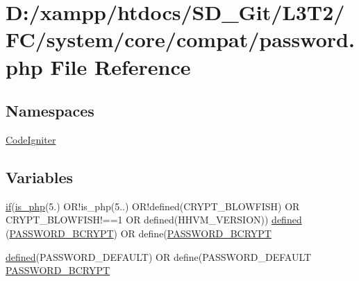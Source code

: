 \hypertarget{system_2core_2compat_2password_8php}{}\section{D\+:/xampp/htdocs/\+S\+D\+\_\+\+Git/\+L3\+T2/\+F\+C/system/core/compat/password.php File Reference}
\label{system_2core_2compat_2password_8php}
\subsection*{Namespaces}
\begin{DoxyCompactItemize}
\item 
 \hyperlink{namespace_code_igniter}{Code\+Igniter}
\end{DoxyCompactItemize}
\subsection*{Variables}
\begin{DoxyCompactItemize}
\item 
\hyperlink{_admin_2assets_2js_2bootstrap_8min_8js_a87cf461060832b8b68a7b48d9e371e4f}{if}(\hyperlink{_admin_2tests_2_bootstrap_8php_acbea7ca989439eea4c6019ad3c5161aa}{is\+\_\+php}(\textquotesingle{}5.\textquotesingle{}) O\+R!is\+\_\+php(\textquotesingle{}5..\textquotesingle{}) O\+R!defined(\textquotesingle{}C\+R\+Y\+P\+T\+\_\+\+B\+L\+O\+W\+F\+I\+S\+H\textquotesingle{}) O\+R C\+R\+Y\+P\+T\+\_\+\+B\+L\+O\+W\+F\+I\+S\+H!==1 O\+R defined(\textquotesingle{}H\+H\+V\+M\+\_\+\+V\+E\+R\+S\+I\+O\+N\textquotesingle{})) \hyperlink{system_2core_2compat_2password_8php_aabb8e1f89683202c71f81779040eb22f}{defined} (\textquotesingle{}\hyperlink{_admin_2system_2core_2compat_2password_8php_a71c35e51b9c76d5ecb437d588ab8f046}{P\+A\+S\+S\+W\+O\+R\+D\+\_\+\+B\+C\+R\+Y\+P\+T}\textquotesingle{}) O\+R define(\textquotesingle{}\hyperlink{_admin_2system_2core_2compat_2password_8php_a71c35e51b9c76d5ecb437d588ab8f046}{P\+A\+S\+S\+W\+O\+R\+D\+\_\+\+B\+C\+R\+Y\+P\+T}\textquotesingle{}
\item 
\hyperlink{_admin_2tests_2_bootstrap_8php_a46458e8654a714e0565e20f63021add9}{defined}(\textquotesingle{}P\+A\+S\+S\+W\+O\+R\+D\+\_\+\+D\+E\+F\+A\+U\+L\+T\textquotesingle{}) O\+R define(\textquotesingle{}P\+A\+S\+S\+W\+O\+R\+D\+\_\+\+D\+E\+F\+A\+U\+L\+T\textquotesingle{} \hyperlink{system_2core_2compat_2password_8php_a71c35e51b9c76d5ecb437d588ab8f046}{P\+A\+S\+S\+W\+O\+R\+D\+\_\+\+B\+C\+R\+Y\+P\+T}
\end{DoxyCompactItemize}


